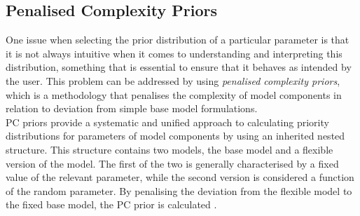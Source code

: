 \subsection{Penalised Complexity Priors}
One issue when selecting the prior distribution of a particular parameter is that it is not always intuitive when it comes to understanding and interpreting this distribution, something that is essential to ensure that it behaves as intended by the user. This problem can be addressed by using \textit{penalised complexity priors}, which is a methodology that penalises the complexity of model components in relation to deviation from simple base model formulations.\\
PC priors provide a systematic and unified approach to calculating priority distributions for parameters of model components by using an inherited nested structure. This structure contains two models, the base model and a flexible version of the model. The first of the two is generally characterised by a fixed value of the relevant parameter, while the second version is considered a function of the random parameter. By penalising the deviation from the flexible model to the fixed base model, the PC prior is calculated \autocite[][]{martins2014penalising}.
